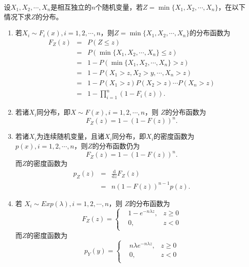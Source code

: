 \begin{example}
    设$X_1,X_2,\cdots,X_n$是相互独立的$n$个随机变量，若$Z=\min\{X_1,X_2,\cdots,X_n\}$，在以下情况下求$Z$的分布。
    \begin{enumerate}
        \item 若$X_i \sim F_i(x),i=1,2,\cdots,n$，则$Z=\min\{X_1,X_2,\cdots,X_n\}$的分布函数为
        \begin{eqnarray*}
            F_Z(z) &=& P(Z\leq z)\\
            &=& P(\min\{X_1,X_2,\cdots,X_n\}\leq z)\\
            &=&1 - P(\min\{X_1,X_2,\cdots,X_n\} > z)\\
            &=& 1- P(X_1> z,X_2> y,\cdots,X_n >z)\\
            &=& 1-P(X_1>z) P(X_2>z) \cdots P(X_n>z)\\
            &=& 1- \prod_{i=1}^n\left( 1-F_{i}(z)\right).
        \end{eqnarray*}
        \item 若诸$X_i$同分布，即$X \sim F(x), i=1,2,\cdots,n$，则
        $Z$的分布函数为
        $$
        F_Z(z) = 1-\left(1-F(z)\right)^n.
        $$
        \item 若诸$X_i$为连续随机变量，且诸$X_i$同分布，即$X_i$的密度函数为$p(x),i=1,2,\cdots,n$，则$Z$的分布函数仍为
        $$
        F_Z(z) =1- \left(1-F(z)\right)^n.
        $$
        而$Z$的密度函数为
        \begin{eqnarray*}
            p_Z(z) &=& \frac{\text{d}}{\text{d}z}F_Z(z) \\
            &=& n \left(1-F(z)\right)^{n-1} p(z).
        \end{eqnarray*}
        \item 若 $X_i \sim Exp(\lambda),i=1,2,\cdots,n$，则
        $Z$的分布函数为
        $$
        F_Z(z) = \left\{
        \begin{aligned}
            & 1-e^{-n\lambda z}, & z\geq 0\\
            & 0, & z < 0\\
        \end{aligned}
        \right.
        $$
        而$Z$的密度函数为
          $$
        p_Y(y) = \left\{
        \begin{aligned}
            & n\lambda e^{-n\lambda z}, & z\geq 0\\
            & 0, & z < 0\\
        \end{aligned}
        \right.
        $$
    \end{enumerate}
\end{example}


